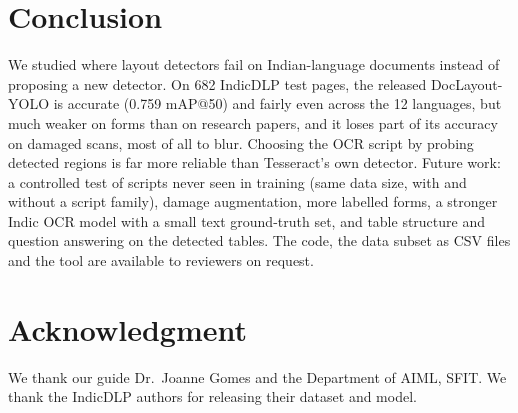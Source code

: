 \documentclass[conference]{IEEEtran}
\begin{document}
\section{Conclusion}
We studied where layout detectors fail on Indian-language documents instead of proposing a new detector. On
682 IndicDLP test pages, the released DocLayout-YOLO is accurate (0.759 mAP@50) and fairly even across
the 12 languages, but much weaker on forms than on research papers, and it loses part of its accuracy on damaged
scans, most of all to blur. Choosing the OCR script by probing detected regions is far more reliable than
Tesseract's own detector. Future work: a controlled test of scripts never seen in training (same data size, with and without a script family), damage augmentation, more labelled forms, a stronger Indic OCR model with
a small text ground-truth set, and table structure and question answering on the detected tables. The code, the
data subset as CSV files and the tool are available to reviewers on request.

\section*{Acknowledgment}
We thank our guide Dr.~Joanne Gomes and the Department of AIML, SFIT. We thank the IndicDLP authors for releasing
their dataset and model.
\end{document}
